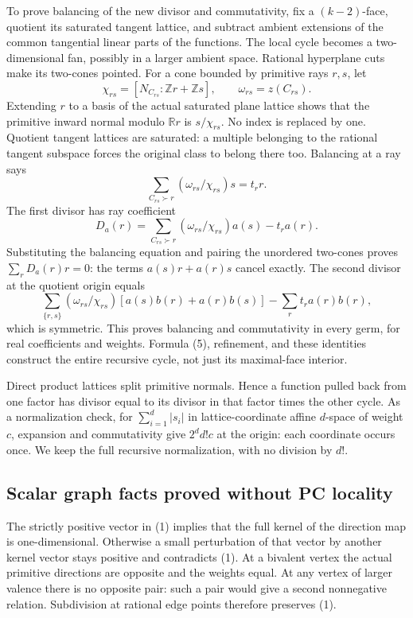 \documentclass[
  11pt,
]{article}
\begin{document}
To prove balancing of the new divisor and commutativity, fix a
\((k-2)\)-face, quotient its saturated tangent lattice, and subtract
ambient extensions of the common tangential linear parts of the
functions. The local cycle becomes a two-dimensional fan, possibly in a
larger ambient space. Rational hyperplane cuts make its two-cones
pointed. For a cone bounded by primitive rays \(r,s\), let \[
 \chi_{rs}=[N_{C_{rs}}:\mathbb Zr+\mathbb Zs],\qquad \omega_{rs}=z(C_{rs}).
\] Extending \(r\) to a basis of the actual saturated plane lattice
shows that the primitive inward normal modulo \(\mathbb Rr\) is
\(s/\chi_{rs}\). No index is replaced by one. Quotient tangent lattices
are saturated: a multiple belonging to the rational tangent subspace
forces the original class to belong there too. Balancing at a ray says
\[
 \sum_{C_{rs}\succ r}(\omega_{rs}/\chi_{rs})s=t_r r.
\] The first divisor has ray coefficient \[
 D_a(r)=\sum_{C_{rs}\succ r}(\omega_{rs}/\chi_{rs})a(s)-t_r a(r).
\] Substituting the balancing equation and pairing the unordered
two-cones proves \(\sum_rD_a(r)r=0\): the terms \(a(s)r+a(r)s\) cancel
exactly. The second divisor at the quotient origin equals \[
 \sum_{\{r,s\}}(\omega_{rs}/\chi_{rs})[a(s)b(r)+a(r)b(s)]
                  -\sum_rt_ra(r)b(r),                       \tag{6}
\] which is symmetric. This proves balancing and commutativity in every
germ, for real coefficients and weights. Formula (5), refinement, and
these identities construct the entire recursive cycle, not just its
maximal-face interior.

Direct product lattices split primitive normals. Hence a function pulled
back from one factor has divisor equal to its divisor in that factor
times the other cycle. As a normalization check, for
\(\sum_{i=1}^d|s_i|\) in lattice-coordinate affine \(d\)-space of weight
\(c\), expansion and commutativity give \(2^d d!c\) at the origin: each
coordinate occurs once. We keep the full recursive normalization, with
no division by \(d!\).

\subsection{Scalar graph facts proved without PC
locality}\label{scalar-graph-facts-proved-without-pc-locality}

The strictly positive vector in (1) implies that the full kernel of the
direction map is one-dimensional. Otherwise a small perturbation of that
vector by another kernel vector stays positive and contradicts (1). At a
bivalent vertex the actual primitive directions are opposite and the
weights equal. At any vertex of larger valence there is no opposite
pair: such a pair would give a second nonnegative relation. Subdivision
at rational edge points therefore preserves (1).
\end{document}
